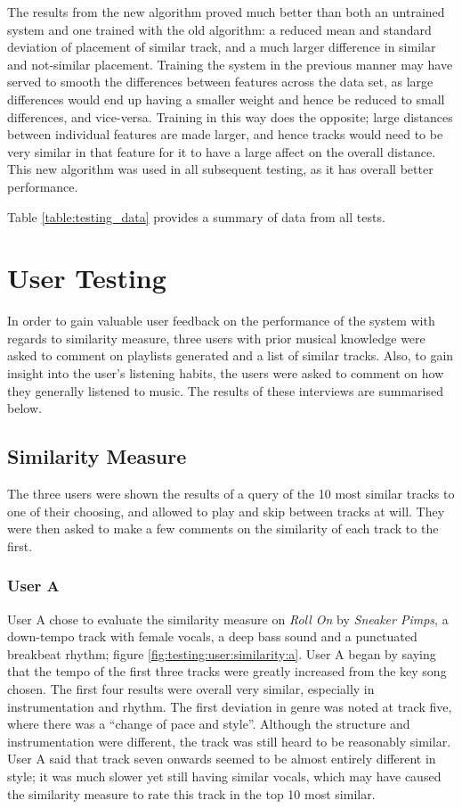The results from the new algorithm proved much better than both an untrained system and one trained with the old algorithm: a reduced mean and standard deviation of placement of similar track, and a much larger difference in similar and not-similar placement. Training the system in the previous manner may have served to smooth the differences between features across the data set, as large differences would end up having a smaller weight and hence be reduced to small differences, and vice-versa. Training in this way does the opposite; large distances between individual features are made larger, and hence tracks would need to be very similar in that feature for it to have a large affect on the overall distance. This new algorithm was used in all subsequent testing, as it has overall better performance.

Table \ref{table:testing_data} provides a summary of data from all tests.

\pagebreak
\section{User Testing}
In order to gain valuable user feedback on the performance of the system with regards to similarity measure, three users with prior musical knowledge were asked to comment on playlists generated and a list of similar tracks. Also, to gain insight into the user's listening habits, the users were asked to comment on how they generally listened to music. The results of these interviews are summarised below.
\subsection{Similarity Measure}
The three users were shown the results of a query of the 10 most similar tracks to one of their choosing, and allowed to play and skip between tracks at will. They were then asked to make a few comments on the similarity of each track to the first.
\subsubsection{User A}
User A chose to evaluate the similarity measure on \emph{Roll On} by \emph{Sneaker Pimps}, a down-tempo track with female vocals, a deep bass sound and a punctuated breakbeat rhythm; figure \ref{fig:testing:user:similarity:a}. User A began by saying that the tempo of the first three tracks were greatly increased from the key song chosen. The first four results were overall very similar, especially in instrumentation and rhythm. The first deviation in genre was noted at track five, where there was a ``change of pace and style''. Although the structure and instrumentation were different, the track was still heard to be reasonably similar. User A said that track seven onwards seemed to be almost entirely different in style; it was much slower yet still having similar vocals, which may have caused the similarity measure to rate this track in the top 10 most similar.


